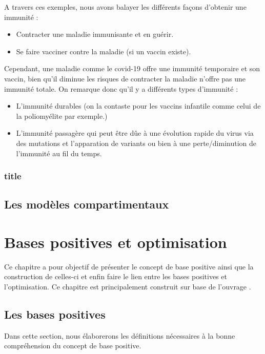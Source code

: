 \documentclass[french]{report}
\begin{document}
A travers ces exemples, nous avons balayer les différents façons d'obtenir une immunité :
\begin{itemize}
    \item Contracter une maladie immunisante et en guérir.
    \item Se faire vacciner contre la maladie (si un vaccin existe).
\end{itemize}

Cependant, une maladie comme le covid-19 offre une immunité temporaire et son vaccin, bien qu'il diminue les risques de contracter la maladie n'offre pas une immunité totale. On remarque donc qu'il y a différents types d'immunité :
\begin{itemize}
    \item L'immunité durables (on la contaste pour les vaccins infantile comme celui de la poliomyélite par exemple.)
    \item L'immunité passagère qui peut être dûe à une évolution rapide du virus via des mutations et l'apparation de variants ou bien à une perte/diminution de l'immunité au fil du temps.
\end{itemize}

\subsection*{title}



\section{Les modèles compartimentaux}





\chapter{Bases positives et optimisation}\label{chapter:Bases positives}

Ce chapitre a pour objectif de présenter le concept de base positive ainsi que la construction de celles-ci et enfin faire le lien entre les bases positives et l'optimisation. Ce chapitre est principalement construit sur base de l'ouvrage \cite{AuHa2017a}.

\section{Les bases positives}
Dans cette section, nous élaborerons les définitions nécessaires à la bonne compréhension du concept de base positive.
\end{document}
